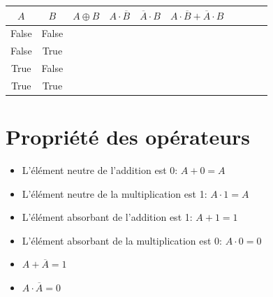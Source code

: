\begin{exercice_cours}[Montrer que l'opérateur OU exclusif peut s'écrire $A \oplus B = A \cdot \overline{B} + \overline{A} \cdot B$]{}

\begin{tabular}{cc|p{1.5cm}|p{1.5cm}|p{1.5cm}|p{1.5cm}|p{1.5cm}|p{1.5cm}|p{1.5cm}|p{1.5cm}|}
	\hline
	$A$ & $B$ & $A \oplus B$ & $A \cdot \overline{B}$ & $\overline{A} \cdot B$ & $A \cdot \overline{B} + \overline{A} \cdot B$ \\
	\hline
	False & False &  &  &  &  \\
	False & True &  &  &  &  \\
	True & False &  &  &  &  \\
	True & True &  &	  &  &  \\
	\hline
\end{tabular}

\end{exercice_cours}

\pagebreak

\section{Propriété des opérateurs}

\begin{propriete}{}
	\begin{itemize}
		\item L'élément neutre de l'addition est 0: $A + 0 = A$
		\item L'élément neutre de la multiplication est 1: $A \cdot 1 = A$
	\end{itemize}
\end{propriete}

\begin{propriete}{}
	\begin{itemize}
		\item L'élément absorbant de l'addition est 1: $A + 1 = 1$
		\item L'élément absorbant de la multiplication est 0: $A \cdot 0 = 0$
	\end{itemize}
\end{propriete}

\begin{propriete}{}
	\begin{itemize}
		\item $A + \overline{A} = 1$
		\item $A \cdot \overline{A} = 0$
	\end{itemize}
\end{propriete}

